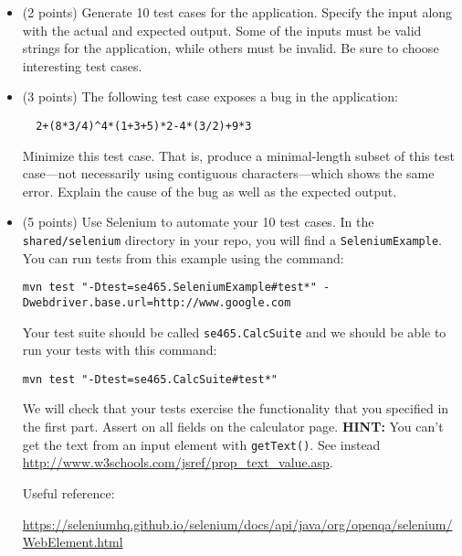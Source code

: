 \documentclass[10pt,hidelinks]{article}
\begin{document}
\begin{itemize}
\item (2 points) Generate 10 test cases for the application. Specify the input along with the actual and expected output. Some of the inputs must be valid strings for the application, while others must be invalid. Be sure to choose interesting test cases.

\item (3 points) The following test case exposes a bug in the application:

\begin{verbatim}
  2+(8*3/4)^4*(1+3+5)*2-4*(3/2)+9*3
\end{verbatim}

Minimize this test case. That is, produce a minimal-length subset of this test case---not necessarily using contiguous characters---which shows the same error. Explain the cause of the bug as well as the expected output.

\item (5 points) Use Selenium to automate your 10 test cases. In the {\tt shared/selenium} directory in your repo, you will find a {\tt SeleniumExample}. You can run tests from this example using the command:

\begin{verbatim}
mvn test "-Dtest=se465.SeleniumExample#test*" -Dwebdriver.base.url=http://www.google.com
\end{verbatim}

Your test suite should be called {\tt se465.CalcSuite} and we should be able to run your tests with this command:

\begin{verbatim}
mvn test "-Dtest=se465.CalcSuite#test*"
\end{verbatim}

We will check that your tests exercise the functionality that you specified in the first part.
Assert on all fields on the calculator page.
{\bf HINT:} You can't get the text from an input element with {\tt getText()}. See instead
\url{http://www.w3schools.com/jsref/prop_text_value.asp}.

Useful reference:

\url{https://seleniumhq.github.io/selenium/docs/api/java/org/openqa/selenium/WebElement.html}

\end{itemize}
\end{document}
